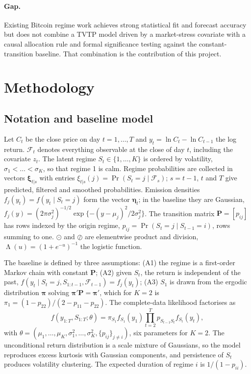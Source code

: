 \documentclass[11pt,a4paper]{article}
\newcommand{\F}{\mathcal{F}}
\newcommand{\bxi}{\bm{\xi}}
\newcommand{\bP}{\mathbf{P}}
\newcommand{\beeta}{\bm{\eta}}
\DeclareMathOperator{\Lam}{\Lambda}
\begin{document}
\paragraph{Gap.} Existing Bitcoin regime work achieves strong statistical fit and forecast accuracy but does not combine a TVTP model driven by a market-stress covariate with a causal allocation rule and formal significance testing against the constant-transition baseline. That combination is the contribution of this project.

\section{Methodology}\label{sec:method}
\subsection{Notation and baseline model}
Let $C_t$ be the close price on day $t=1,\dots,T$ and $y_t=\ln C_t-\ln C_{t-1}$ the log return. $\F_t$ denotes everything observable at the close of day $t$, including the covariate $z_t$. The latent regime $S_t\in\{1,\dots,K\}$ is ordered by volatility, $\sigma_1<\dots<\sigma_K$, so that regime 1 is calm. Regime probabilities are collected in vectors $\bxi_{t|s}$ with entries $\xi_{t|s}(j)=\Pr(S_t=j\mid\F_s)$; $s=t-1$, $t$ and $T$ give predicted, filtered and smoothed probabilities. Emission densities $f_j(y_t)=f(y_t\mid S_t=j)$ form the vector $\beeta_t$; in the baseline they are Gaussian, $f_j(y)=(2\pi\sigma_j^2)^{-1/2}\exp\{-(y-\mu_j)^2/2\sigma_j^2\}$. The transition matrix $\bP=[p_{ij}]$ has rows indexed by the origin regime, $p_{ij}=\Pr(S_t=j\mid S_{t-1}=i)$, rows summing to one. $\odot$ and $\oslash$ are elementwise product and division, $\Lam(u)=(1+e^{-u})^{-1}$ the logistic function.

The baseline is defined by three assumptions: (A1) the regime is a first-order Markov chain with constant $\bP$; (A2) given $S_t$, the return is independent of the past, $f(y_t\mid S_t=j,S_{1:t-1},\F_{t-1})=f_j(y_t)$; (A3) $S_1$ is drawn from the ergodic distribution $\bm\pi$ solving $\bm\pi'\bP=\bm\pi'$, which for $K=2$ is $\pi_1=(1-p_{22})/(2-p_{11}-p_{22})$. The complete-data likelihood factorises as
\begin{equation}\label{eq:complete}
f(y_{1:T},S_{1:T};\theta)=\pi_{S_1}f_{S_1}(y_1)\prod_{t=2}^T p_{S_{t-1}S_t}f_{S_t}(y_t),
\end{equation}
with $\theta=(\mu_1,\dots,\mu_K,\sigma_1^2,\dots,\sigma_K^2,\{p_{ij}\}_{j\ne i})$, six parameters for $K=2$. The unconditional return distribution is a scale mixture of Gaussians, so the model reproduces excess kurtosis with Gaussian components, and persistence of $S_t$ produces volatility clustering. The expected duration of regime $i$ is $1/(1-p_{ii})$.
\end{document}
